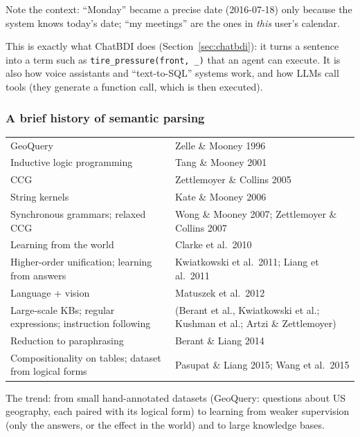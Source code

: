 Note the context: ``Monday'' became a precise date (2016-07-18) only because the system
knows today's date; ``my meetings'' are the ones in \emph{this} user's calendar.

\begin{nbwhy}
This is exactly what ChatBDI does (Section~\ref{sec:chatbdi}): it turns a sentence into a
term such as \texttt{tire\_pressure(front, \_)} that an agent can execute. It is also how
voice assistants and ``text-to-SQL'' systems work, and how LLMs call tools (they generate
a function call, which is then executed).
\end{nbwhy}

\subsubsection{A brief history of semantic parsing}

\begin{center}
\small
\begin{tabularx}{\linewidth}{@{}>{\raggedright\arraybackslash}X >{\raggedright\arraybackslash}X@{}}
\toprule
GeoQuery & Zelle \& Mooney 1996 \\
Inductive logic programming & Tang \& Mooney 2001 \\
CCG & Zettlemoyer \& Collins 2005 \\
String kernels & Kate \& Mooney 2006 \\
Synchronous grammars; relaxed CCG & Wong \& Mooney 2007; Zettlemoyer \& Collins 2007 \\
Learning from the world & Clarke et al.\ 2010 \\
Higher-order unification; learning from answers & Kwiatkowski et al.\ 2011; Liang et al.\ 2011 \\
Language + vision & Matuszek et al.\ 2012 \\
Large-scale KBs; regular expressions; instruction following & 2013 (Berant et al., Kwiatkowski et al.; Kushman et al.; Artzi \& Zettlemoyer) \\
Reduction to paraphrasing & Berant \& Liang 2014 \\
Compositionality on tables; dataset from logical forms & Pasupat \& Liang 2015; Wang et al.\ 2015 \\
\bottomrule
\end{tabularx}
\end{center}

The trend: from small hand-annotated datasets (GeoQuery: questions about US geography,
each paired with its logical form) to learning from weaker supervision (only the answers,
or the effect in the world) and to large knowledge bases.

